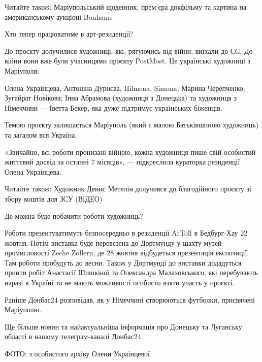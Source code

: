 Читайте також: Маріупольський щоденник: прем'єра докфільму та картина на
американському аукціоні Bonhams

Хто тепер працюватиме в арт-резиденції?

До проєкту долучилися художниці, які, рятуючись від війни, виїхали до ЄС. До
війни вони вже були учасницями проєкту PostMost. Це українські художниці з
Маріуполя:

Олена Украінцева, Антоніна Дурнєва, Hilmena, Simona, Марина Черепченко,
Зугайрат Новікова; Інна Абрамова (художниця з Донецька) та художниця з
Німеччини — Іветта Бекер, яка дуже підтримує українських біженців.

Темою проєкту залишається Маріуполь (який є малою Батьківшиною художниць) та
загалом вся Україна.

«Звичайно, всі роботи пронизані війною, кожна художниця пише свій особистий
життєвий досвід за останні 7 місяців», — підкреслила кураторка резиденції Олена
Украінцева.

Читайте також: Художник Денис Метелін долучився до благодійного проєкту зі
збору коштів для ЗСУ (ВІДЕО)

Де можна буде побачити роботи художниць?

Роботи презентуватимуть безпосередньо в резиденції ArToll в Бедбург-Хау 22
жовтня. Потім виставка буде перевезена до Дортмунду у шахту-музей промисловості
Zeche Zollern, де 28 жовтня відбудеться презентація експозиції. Там роботи
пробудуть до весни. Також у Дортмунді до виставки додадуться принти робіт
Анастасії Шишкіної та Олександра Малаховського, які перебувають наразі в
Україні та не мають можливості особисто взяти участь у проєкті.

Раніше Донбас24 розповідав, як у Німеччині створюються футболки, присвячені
Маріуполю.

Ще більше новин та найактуальніша інформація про Донецьку та Луганську області
в нашому телеграм-каналі Донбас24.

ФОТО: з особистого архіву Олени Украінцевої.
